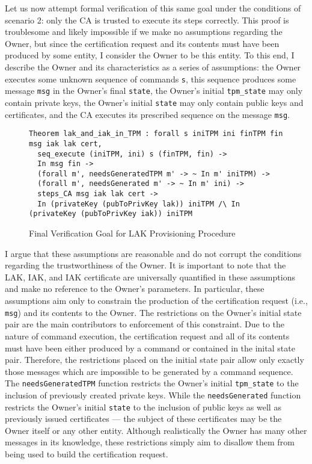 \documentclass[runningheads]{llncs}
\begin{document}
Let us now attempt formal verification of this same goal under the conditions of scenario 2: only the CA is trusted to execute its steps correctly. This proof is troublesome and likely impossible if we make no assumptions regarding the Owner, but since the certification request and its contents must have been produced by some entity, I consider the Owner to be this entity.
To this end, I describe the Owner and its characteristics as a series of assumptions: the Owner executes some unknown sequence of commands \verb|s|, this sequence produces some message \verb|msg| in the Owner's final \verb|state|, the Owner's initial \verb|tpm_state| may only contain private keys, the Owner's initial \verb|state| may only contain public keys and certificates, and the CA executes its prescribed sequence on the message \verb|msg|. 

\begin{figure}[hbtp]
\begin{lstlisting}[language=Coq]
Theorem lak_and_iak_in_TPM : forall s iniTPM ini finTPM fin msg iak lak cert,
  seq_execute (iniTPM, ini) s (finTPM, fin) -> 
  In msg fin ->
  (forall m', needsGeneratedTPM m' -> ~ In m' iniTPM) ->
  (forall m', needsGenerated m' -> ~ In m' ini) ->
  steps_CA msg iak lak cert ->
  In (privateKey (pubToPrivKey lak)) iniTPM /\ In (privateKey (pubToPrivKey iak)) iniTPM
\end{lstlisting}
\caption{Final Verification Goal for LAK Provisioning Procedure}
\label{fig:lak_goal}
\end{figure}

I argue that these assumptions are reasonable and do not corrupt the conditions regarding the trustworthiness of the Owner. It is important to note that the LAK, IAK, and IAK certificate are universally quantified in these assumptions and make no reference to the Owner's parameters. In particular, these assumptions aim only to constrain the production of the certification request (i.e., \verb|msg|) and its contents to the Owner. 
The restrictions on the Owner's initial state pair are the main contributors to enforcement of this constraint. Due to the nature of command execution, the certification request and all of its contents must have been either produced by a command or contained in the inital state pair. 
Therefore, the restrictions placed on the initial state pair allow only exactly those messages which are impossible to be generated by a command sequence.
The \verb|needsGeneratedTPM| function restricts the Owner's initial \verb|tpm_state| to the inclusion of previously created private keys. While the \verb|needsGenerated| function restricts the Owner's initial \verb|state| to the inclusion of public keys as well as previously issued certificates --- the subject of these certificates may be the Owner itself or any other entity.
Although realistically the Owner has many other messages in its knowledge, these restrictions simply aim to disallow them from being used to build the certification request. 
\end{document}
